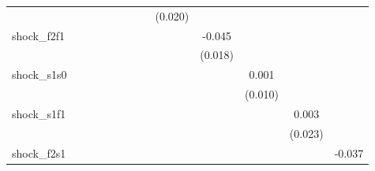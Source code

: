 {\begin{tabular}{l*{12}{c}}
            &                     &                     &                     &                     &                     &                     &                     &     (0.020)         &                     &                     &                     &                     \\
\addlinespace
shock\_f2f1  &                     &                     &                     &                     &                     &                     &                     &                     &      -0.045\sym{**} &                     &                     &                     \\
            &                     &                     &                     &                     &                     &                     &                     &                     &     (0.018)         &                     &                     &                     \\
\addlinespace
shock\_s1s0  &                     &                     &                     &                     &                     &                     &                     &                     &                     &       0.001         &                     &                     \\
            &                     &                     &                     &                     &                     &                     &                     &                     &                     &     (0.010)         &                     &                     \\
\addlinespace
shock\_s1f1  &                     &                     &                     &                     &                     &                     &                     &                     &                     &                     &       0.003         &                     \\
            &                     &                     &                     &                     &                     &                     &                     &                     &                     &                     &     (0.023)         &                     \\
\addlinespace
shock\_f2s1  &                     &                     &                     &                     &                     &                     &                     &                     &                     &                     &                     &      -0.037\sym{**} \\

\end{tabular}}
